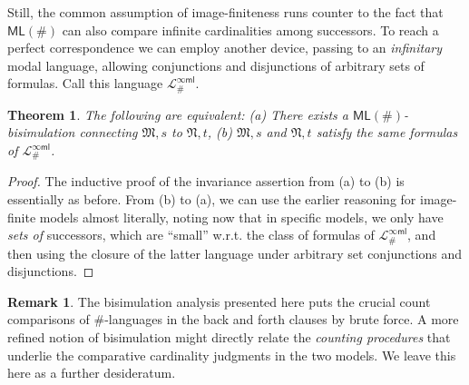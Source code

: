 \documentclass[12pt,oneside,reqno]{amsart}
\newtheorem{theorem}{Theorem}
\theoremstyle{definition}
\newtheorem{remark}{Remark}
\begin{document}


Still, the common assumption of image-finiteness runs counter to the fact that $\mathsf{ML}(\#)$ can also compare infinite cardinalities among successors. To reach a perfect correspondence we can employ another device, passing to an  \emph{infinitary} modal language, allowing conjunctions and disjunctions of arbitrary sets of formulas. Call this language $\mathcal{L}_\#^{\infty\mathsf{ml}}$.


\begin{theorem} The following are equivalent: (a) There exists a $\mathsf{ML}(\#)$-bisimulation connecting $\mathfrak{M}, s$ to $\mathfrak{N}, t$, (b) $\mathfrak{M}, s$ and $\mathfrak{N}, t$ satisfy the same formulas of $\mathcal{L}_\#^{\infty\mathsf{ml}}$.
\end{theorem}
\begin{proof} The inductive proof of the invariance assertion from (a) to (b) is essentially as before. From (b) to (a), we can use the earlier reasoning for image-finite models almost literally, noting now that in specific models, we only have \emph{sets of} successors, which are ``small'' w.r.t. the class of formulas of $\mathcal{L}_\#^{\infty\mathsf{ml}}$, and then using the closure of the latter  language under arbitrary set conjunctions and disjunctions. \end{proof}



\begin{remark} \label{remark:bisim} The bisimulation analysis presented here puts the crucial count comparisons of $\#$-languages in the back and forth clauses by brute force. A more refined notion of bisimulation might directly relate the {\it counting procedures} that underlie the comparative cardinality judgments in the two models. We leave this here as a further desideratum.\end{remark}
\end{document}
